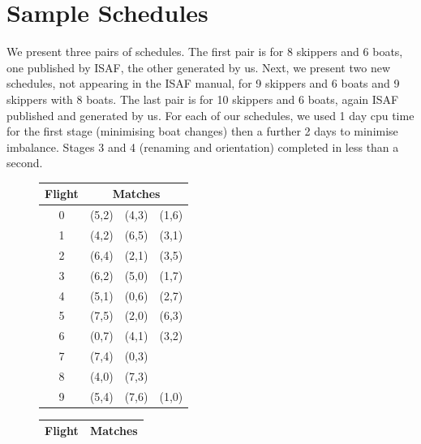 \documentclass{llncs}
\begin{document}
\section{Sample Schedules}\label{sec:samples}
We present three pairs of schedules. The first pair is for 8 skippers and 6 boats, one published by ISAF, the other generated by us. Next, we present two new schedules, not appearing in the ISAF manual, for 9 skippers and 6 boats and 9 skippers with 8 boats. The last pair is for 10 skippers and 6 boats, again ISAF published and generated by us. For each of our schedules, we used 1 day cpu time for the first stage (minimising boat changes) then a further 2 days to minimise imbalance. Stages 3 and 4 (renaming and orientation) completed in less than a second.

\begin{center}
\begin{figure}[h]
\begin{minipage}[t]{0.5\textwidth}
\hspace{0.6cm}
\begin{tabular}{cccc}
        \toprule
        Flight & \multicolumn{3}{c}{Matches} \\ \midrule
        0 & (5,2) & (4,3) & (1,6) \\ 
        1 & (4,2)  & (6,5) & (3,1) \\
        2 & (6,4) & (2,1) & (3,5) \\
        3 & (6,2) & (5,0) & (1,7) \\
        4 & (5,1) & (0,6) & (2,7) \\
        5 & (7,5) & (2,0) & (6,3) \\
        6 & (0,7) & (4,1) & (3,2) \\
       7 & (7,4)  & (0,3) &  \\
       8 & (4,0)  & (7,3) &  \\
       9 & (5,4)  & (7,6) & (1,0) \\ \bottomrule
    \end{tabular}
\label{08-06a}
\end{minipage}
\hfill
\begin{minipage}[t]{0.5\textwidth}
\hspace{0.6cm}
\begin{tabular}{cccc}
        \toprule
        Flight & \multicolumn{3}{c}{Matches} \\ \midrule

\end{tabular}
\end{minipage}
\end{figure}
\end{center}
\end{document}
